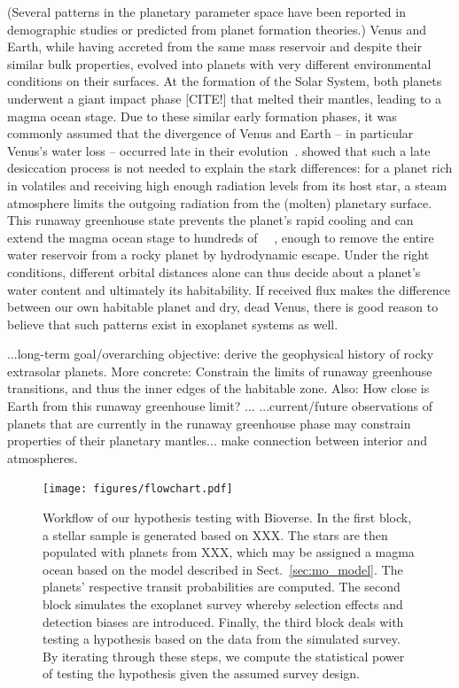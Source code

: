 \documentclass[modern]{aastex631}
\begin{document}
\begin{note}
(Several patterns in the planetary parameter space have been reported in demographic studies or predicted from planet formation theories.)
    Venus and Earth, while having accreted from the same mass reservoir and despite their similar bulk properties, evolved into planets with very different environmental conditions on their surfaces.
    At the formation of the Solar System, both planets underwent a giant impact phase [CITE!] that melted their mantles, leading to a magma ocean stage.
    Due to these similar early formation phases, it was commonly assumed that the divergence of Venus and Earth -- in particular Venus's water loss -- occurred late in their evolution~\citep{Elkins-Tanton2013}.
    \citet{Hamano2013} showed that such a late desiccation process is not needed to explain the stark differences: for a planet rich in volatiles and receiving high enough radiation levels from its host star, a steam atmosphere limits the outgoing radiation from the (molten) planetary surface.
    This runaway greenhouse state prevents the planet's rapid cooling and can extend the magma ocean stage to hundreds of \SI{}{\mega\year}, enough to remove the entire water reservoir from a rocky planet by hydrodynamic escape.
    Under the right conditions, different orbital distances alone can thus decide about a planet's water content and ultimately its habitability.
    If received flux makes the difference between our own habitable planet and dry, dead Venus, there is good reason to believe that such patterns exist in exoplanet systems as well.

    ...long-term goal/overarching objective: derive the geophysical history of rocky extrasolar planets. More concrete: Constrain the limits of runaway greenhouse transitions, and thus the inner edges of the habitable zone. Also: How close is Earth from this runaway greenhouse limit?
   ...
    ...current/future observations of planets that are currently in the runaway greenhouse phase may constrain properties of their planetary mantles... make connection between interior and atmospheres.
\end{note}

\begin{figure}
    \begin{centering}
        \texttt{[image: figures/flowchart.pdf]}
        \caption{Workflow of our hypothesis testing with Bioverse. In the first block, a stellar sample is generated based on XXX. The stars are then populated with planets from XXX, which may be assigned a magma ocean based on the model described in Sect.~\ref{sec:mo_model}. The planets' respective transit probabilities are computed. The second block simulates the exoplanet survey whereby selection effects and detection biases are introduced. Finally, the third block deals with testing a hypothesis based on the data from the simulated survey. By iterating through these steps, we compute the statistical power of testing the hypothesis given the assumed survey design.}
        \label{fig:flowchart}
    \end{centering}
\end{figure}
\end{document}
